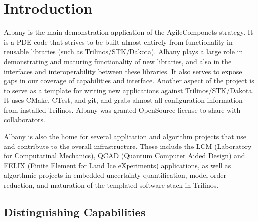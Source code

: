 \documentclass[pdf,12pt,report,strict]{SANDreport}
\theoremstyle{remark}
\begin{document}


%
\SANDmain           %

\chapter{Introduction}
\label{Intro}

Albany is the main demonstration application of the AgileComponets
strategy. It is a PDE code that strives to be built almost entirely
from functionality in reusable libraries (such as
Trilinos/STK/Dakota). Albany plays a large role in demonstrating and
maturing functionality of new libraries, and also in the interfaces
and interoperability between these libraries. It also serves to expose
gaps in our coverage of capabilities and interface. Another aspect of
the project is to serve as a template for writing new applications
against Trilinos/STK/Dakota. It uses CMake, CTest, and git, and grabs
almost all configuration information from installed Trilinos. Albany
was granted OpenSource license to share with collaborators.

Albany is also the home for several application and algorithm
projects that use and contribute to the overall infrastructure.
These include the LCM (Laboratory for Computatinal Mechanics),
QCAD (Quantum Computer Aided Design) and FELIX (Finite Element for
Land Ice eXperiments) applications, as well as algorthmic projects
in embedded uncertainty quantification, model order reduction, and
maturation of the templated software stack in Trilinos.


\section{Distinguishing Capabilities}
\end{document}
